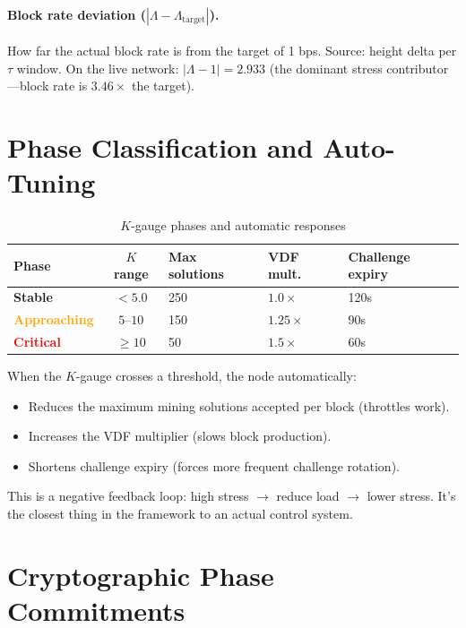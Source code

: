 \documentclass[11pt,a4paper]{article}
\begin{document}
\paragraph{Block rate deviation ($|\Lambda - \Lambda_{\text{target}}|$).} How far the actual block rate is from the target of 1 bps. Source: height delta per $\tau$ window. On the live network: $|\Lambda - 1| = 2.933$ (the dominant stress contributor---block rate is $3.46\times$ the target).

\section{Phase Classification and Auto-Tuning}

\begin{table}[H]
\centering
\caption{$K$-gauge phases and automatic responses}
\label{tab:kphase}
\begin{tabular}{@{}lclll@{}}
\toprule
\textbf{Phase} & \textbf{$K$ range} & \textbf{Max solutions} & \textbf{VDF mult.} & \textbf{Challenge expiry} \\
\midrule
\textcolor{green!60!black}{\textbf{Stable}}      & $< 5.0$ & 250 & $1.0\times$ & 120s \\
\textcolor{orange}{\textbf{Approaching}} & $5$--$10$ & 150 & $1.25\times$ & 90s \\
\textcolor{red}{\textbf{Critical}}    & $\geq 10$ & 50 & $1.5\times$ & 60s \\
\bottomrule
\end{tabular}
\end{table}

When the $K$-gauge crosses a threshold, the node automatically:
\begin{itemize}[nosep]
    \item Reduces the maximum mining solutions accepted per block (throttles work).
    \item Increases the VDF multiplier (slows block production).
    \item Shortens challenge expiry (forces more frequent challenge rotation).
\end{itemize}

This is a negative feedback loop: high stress $\to$ reduce load $\to$ lower stress. It's the closest thing in the framework to an actual control system.

\section{Cryptographic Phase Commitments}
\end{document}
